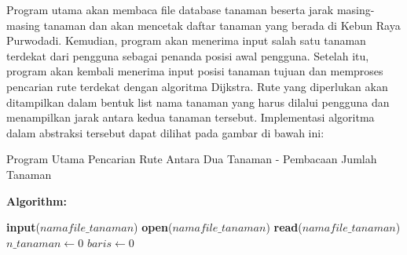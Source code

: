 \documentclass[conference]{IEEEtran}
\begin{document}
	Program utama akan membaca file database tanaman beserta jarak masing-masing tanaman dan akan mencetak daftar tanaman yang berada di Kebun Raya Purwodadi. Kemudian, program akan menerima input salah satu tanaman terdekat dari pengguna sebagai penanda posisi awal pengguna. Setelah itu, program akan kembali menerima input posisi tanaman tujuan dan memproses pencarian rute terdekat dengan algoritma Dijkstra. Rute yang diperlukan akan ditampilkan dalam bentuk list nama tanaman yang harus dilalui pengguna dan menampilkan jarak antara kedua tanaman tersebut. Implementasi algoritma dalam abstraksi tersebut dapat dilihat pada gambar di bawah ini:
\begin{algorithm}
\caption{Program Utama Pencarian Rute Antara Dua Tanaman - Pembacaan Jumlah Tanaman}\label{alg:four}
\textbf{Algorithm:}

\textbf{input}($namafile\_tanaman$)\;
\textbf{open}($namafile\_tanaman$)\;
\textbf{read}($namafile\_tanaman$)\;
$n\_tanaman \gets 0$\;
$baris \gets 0$\;
\end{algorithm}
	
\end{document}
